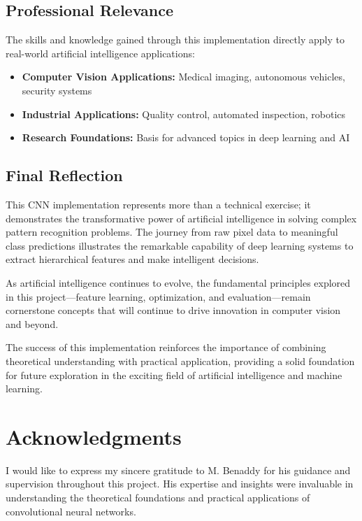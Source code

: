 \documentclass[11pt,a4paper]{article}
\begin{document}
\subsection{Professional Relevance}

The skills and knowledge gained through this implementation directly apply to real-world artificial intelligence applications:

\begin{itemize}
    \item \textbf{Computer Vision Applications:} Medical imaging, autonomous vehicles, security systems
    \item \textbf{Industrial Applications:} Quality control, automated inspection, robotics
    \item \textbf{Research Foundations:} Basis for advanced topics in deep learning and AI
\end{itemize}

\subsection{Final Reflection}

This CNN implementation represents more than a technical exercise; it demonstrates the transformative power of artificial intelligence in solving complex pattern recognition problems. The journey from raw pixel data to meaningful class predictions illustrates the remarkable capability of deep learning systems to extract hierarchical features and make intelligent decisions.

As artificial intelligence continues to evolve, the fundamental principles explored in this project—feature learning, optimization, and evaluation—remain cornerstone concepts that will continue to drive innovation in computer vision and beyond.

The success of this implementation reinforces the importance of combining theoretical understanding with practical application, providing a solid foundation for future exploration in the exciting field of artificial intelligence and machine learning.

\section*{Acknowledgments}

I would like to express my sincere gratitude to M. Benaddy for his guidance and supervision throughout this project. His expertise and insights were invaluable in understanding the theoretical foundations and practical applications of convolutional neural networks.
\end{document}
